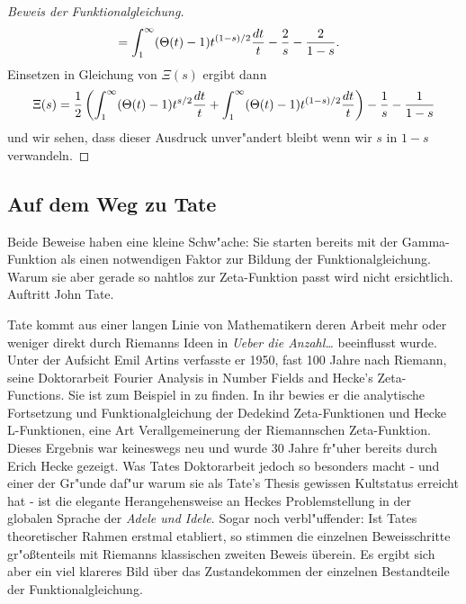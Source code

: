 \begin{proof}[Beweis der Funktionalgleichung]
\begin{align*}
				&= \int_{1}^{\infty} (\Theta(t) - 1) t^{(1-s)/2}  \frac{\dx[t]}{t} - \frac{2}{s} - \frac{2}{1-s}.
		\end{align*}
		Einsetzen in Gleichung von $\Xi(s)$ ergibt dann
		\begin{align*}
			\Xi(s)
				= \frac{1}{2} \left( \int_{1}^{\infty} (\Theta(t) - 1) t^{s/2}  \frac{\dx[t]}{t} + \int_{1}^{\infty} (\Theta(t) - 1) t^{(1-s)/2}  \frac{\dx[t]}{t} \right)  - \frac{1}{s} - \frac{1}{1-s}
		\end{align*}
		und wir sehen, dass dieser Ausdruck unver"andert bleibt wenn wir $s$ in $1-s$ verwandeln.
	\end{proof}

\subsection{Auf dem Weg zu Tate}
	Beide Beweise haben eine kleine Schw"ache: Sie starten bereits mit der Gamma-Funktion als einen notwendigen Faktor zur Bildung der Funktionalgleichung.
	Warum sie aber gerade so nahtlos zur Zeta-Funktion passt wird nicht ersichtlich. 
	Auftritt John Tate.
	
	Tate kommt aus einer langen Linie von Mathematikern deren Arbeit mehr oder weniger direkt durch Riemanns Ideen in  \emph{Ueber die Anzahl\dots} beeinflusst wurde.
	Unter der Aufsicht Emil Artins verfasste er 1950, fast 100 Jahre nach Riemann, seine Doktorarbeit \glqq Fourier Analysis in Number Fields and Hecke's Zeta-Functions\grqq{}\cite{tate}. Sie ist zum Beispiel in \cite{cassels1967algebraic} zu finden.
	In ihr bewies er die analytische Fortsetzung und Funktionalgleichung der Dedekind Zeta-Funktionen und Hecke L-Funktionen, eine Art Verallgemeinerung der Riemannschen Zeta-Funktion.
	Dieses Ergebnis war keineswegs neu und wurde 30 Jahre fr"uher bereits durch Erich Hecke gezeigt.
	Was Tates Doktorarbeit jedoch so besonders macht - und einer der Gr"unde daf"ur warum sie als  \glqq Tate's Thesis\grqq{} gewissen Kultstatus erreicht hat - ist die elegante Herangehensweise an Heckes Problemstellung in der globalen Sprache der \emph{Adele und Idele}.
	Sogar noch verbl"uffender: Ist Tates theoretischer Rahmen erstmal etabliert, so stimmen die einzelnen Beweisschritte gr"oßtenteils mit Riemanns klassischen zweiten Beweis überein.
	Es ergibt sich aber ein viel klareres Bild über das Zustandekommen der einzelnen Bestandteile der Funktionalgleichung.
	
